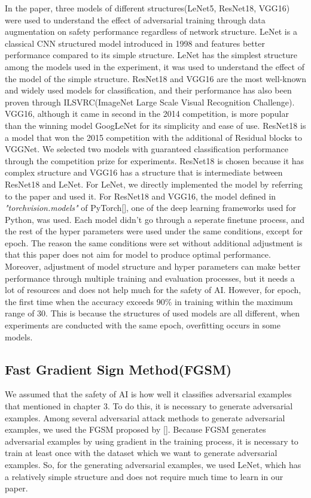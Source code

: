 \documentclass[journal,article,submit,moreauthors,pdftex]{Definitions/mdpi}
\begin{document}
In the paper, three models of different structures(LeNet5, ResNet18, VGG16) were used to understand the effect of adversarial training through data augmentation on safety performance regardless of network structure.
LeNet is a classical CNN  structured model introduced in 1998 and features better performance compared to its simple structure.
LeNet has the simplest structure among the models used in the experiment, it was used to understand the effect of the model of the simple structure.
ResNet18 and VGG16 are the most well-known and widely used models for classification, and their performance has also been proven through ILSVRC(ImageNet Large Scale Visual Recognition Challenge).
VGG16, although it came in second in the 2014 competition, is more popular than the winning model GoogLeNet for its simplicity and ease of use.
ResNet18 is a model that won the 2015 competition with the additional of Residual blocks to VGGNet.
We selected two models with guaranteed classification performance through the competition prize for experiments.
ResNet18 is chosen because it has complex structure and VGG16 has a structure that is intermediate between ResNet18 and LeNet.
For LeNet, we directly implemented the model by referring to the paper and used it.
For ResNet18 and VGG16, the model defined in {\it "torchvision.models"} of PyTorch[], one of the deep learning frameworks used for Python, was used.
Each model didn't go through a seperate finetune process, and the rest of the hyper parameters were used under the same conditions, except for epoch.
The reason the same conditions were set without additional adjustment is that this paper does not aim for model to produce optimal performance.
Moreover, adjustment of model structure and hyper parameters can make better performance through multiple training and evaluation processes, but it needs a lot of resources and does not help much for the safety of AI.
However, for epoch, the first time when the accuracy exceeds 90\% in training within the maximum range of 30. This is because the structures of used models are all different, when experiments are conducted with the same epoch, overfitting occurs in some models.

\subsection{Fast Gradient Sign Method(FGSM)}

We assumed that the safety of AI is how well it classifies adversarial examples that mentioned in chapter 3.
To do this, it is necessary to generate adversarial examples. Among several adversarial attack methods to generate adversarial examples, we used the FGSM proposed by [].
Because FGSM generates adversarial examples by using gradient in the training process, it is necessary to train at least once with the dataset which we want to generate adversarial examples.
So, for the generating adversarial examples, we used LeNet, which has a relatively simple structure and does not require much time to learn in our paper.
\end{document}

